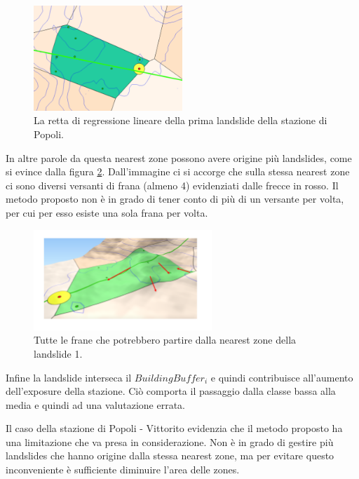 	\begin{figure}[h]
	\centering
	\includegraphics[width=0.5\textwidth]{images/PopoliRect}
	\caption{La retta di regressione lineare della prima landslide della stazione di Popoli.}
	\label{popolirect}
\end{figure}


In altre parole da questa nearest zone possono avere origine più landslides, come si evince dalla figura \ref{popolimultilandslide}. Dall'immagine ci si accorge che sulla stessa nearest zone ci sono diversi versanti di frana (almeno 4) evidenziati dalle frecce in rosso. Il metodo proposto non è in grado di tener conto di più di un versante per volta, per cui per esso esiste una sola frana per volta. 

\begin{figure}[h]
	\centering
	\includegraphics[width=0.6\textwidth]{images/PopoliMultiLandslide}
	\caption{Tutte le frane che potrebbero partire dalla nearest zone della landslide 1.}
	\label{popolimultilandslide}
\end{figure}

Infine la landslide interseca il $BuildingBuffer_i$ e quindi contribuisce all'aumento dell'exposure della stazione. Ciò comporta il passaggio dalla classe bassa alla media e quindi ad una valutazione errata.

Il caso della stazione di Popoli - Vittorito evidenzia che il metodo proposto ha una limitazione che va presa in considerazione. Non è in grado di gestire più landslides che hanno origine dalla stessa nearest zone, ma per evitare questo inconveniente è sufficiente diminuire l'area delle zones.

